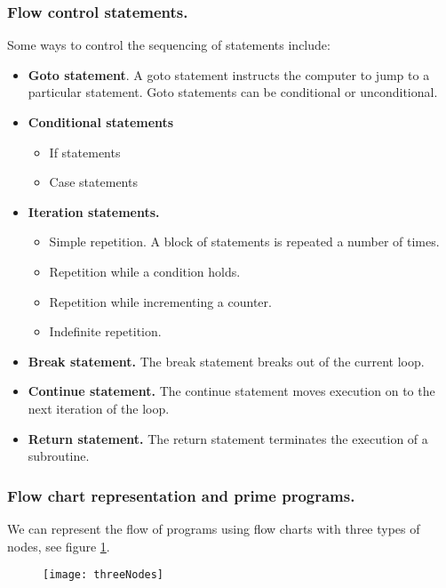 \subsubsection{Flow control statements.}
Some ways to control the sequencing of statements include:

\begin{itemize}
\item \textbf{Goto statement}. A goto statement instructs the computer to jump to a particular statement. Goto statements can be conditional or unconditional.

\item \textbf{Conditional statements}
\begin{itemize}
\item If statements
\item Case statements
\end{itemize}

\item \textbf{Iteration statements.}
\begin{itemize}
\item Simple repetition. A block of statements is repeated a number of times.
\item Repetition while a condition holds.
\item Repetition while incrementing a counter.
\item Indefinite repetition.
\end{itemize}


\item \textbf{Break statement.} The break statement breaks out of the current loop.
\item \textbf{Continue statement.} The continue statement moves execution on to the next iteration of the loop.
\item \textbf{Return statement.} The return statement terminates the execution of a subroutine.

\end{itemize}

\subsubsection{Flow chart representation and prime programs.} We can represent the flow of programs using flow charts with three types of nodes, see figure \ref{threeNodes}.

\begin{figure}[h]
\label{threeNodes}
\texttt{[image: threeNodes]}
\centering
\end{figure}

